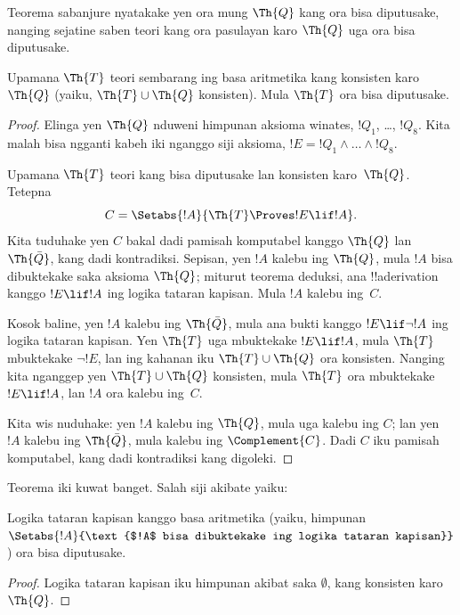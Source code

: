 \documentclass[../../../include/open-logic-section]{subfiles}
\begin{document}


Teorema sabanjure nyatakake yen ora mung $\Th{Q}$ kang ora bisa
diputusake, nanging sejatine saben teori kang ora pasulayan karo
$\Th{Q}$ uga ora bisa diputusake.

\begin{thm}
Upamana $\Th{T}$ teori sembarang ing basa aritmetika kang konsisten
karo $\Th{Q}$ (yaiku, $\Th{T} \cup \Th{Q}$ konsisten). Mula
$\Th{T}$ ora bisa diputusake.
\end{thm}

\begin{proof}
Elinga yen $\Th{Q}$ nduweni himpunan aksioma winates, $!Q_1$, \dots,
$!Q_8$. Kita malah bisa ngganti kabeh iki nganggo siji aksioma,
$!E = !Q_1 \land \dots \land !Q_8$.

Upamana $\Th{T}$ teori kang bisa diputusake lan konsisten karo~$\Th{Q}$.
Tetepna
\[
C = \Setabs{!A}{\Th{T} \Proves !E \lif !A}.
\]
Kita tuduhake yen $C$ bakal dadi pamisah komputabel kanggo $\Th{Q}$ lan
$\Th{\bar Q}$, kang dadi kontradiksi. Sepisan, yen $!A$ kalebu ing
$\Th{Q}$, mula $!A$ bisa dibuktekake saka aksioma $\Th{Q}$; miturut
teorema deduksi, ana !!a{derivation} kanggo $!E \lif !A$ ing logika tataran kapisan.
Mula $!A$ kalebu ing~$C$.

Kosok baline, yen $!A$ kalebu ing $\Th{\bar Q}$, mula ana bukti
kanggo $!E \lif \lnot !A$ ing logika tataran kapisan. Yen $\Th{T}$ uga
mbuktekake $!E \lif !A$, mula $\Th{T}$ mbuktekake $\lnot !E$, lan ing
kahanan iku $\Th{T} \cup \Th{Q}$ ora konsisten. Nanging kita nganggep
yen $\Th{T} \cup \Th{Q}$ konsisten, mula $\Th{T}$ ora mbuktekake
$!E \lif !A$, lan $!A$ ora kalebu ing~$C$.

Kita wis nuduhake: yen $!A$ kalebu ing $\Th{Q}$, mula uga kalebu ing
$C$; lan yen $!A$ kalebu ing $\Th{\bar Q}$, mula kalebu ing
$\Complement{C}$. Dadi $C$ iku pamisah komputabel, kang dadi
kontradiksi kang digoleki.
\end{proof}

Teorema iki kuwat banget. Salah siji akibate yaiku:

\begin{cor}
  Logika tataran kapisan kanggo basa aritmetika (yaiku, himpunan
  $\Setabs{!A}{\text{$!A$ bisa dibuktekake ing logika tataran kapisan}}$)
  ora bisa diputusake.
\end{cor}

\begin{proof}
Logika tataran kapisan iku himpunan akibat saka $\emptyset$,
kang konsisten karo~$\Th{Q}$.
\end{proof}
\end{document}
